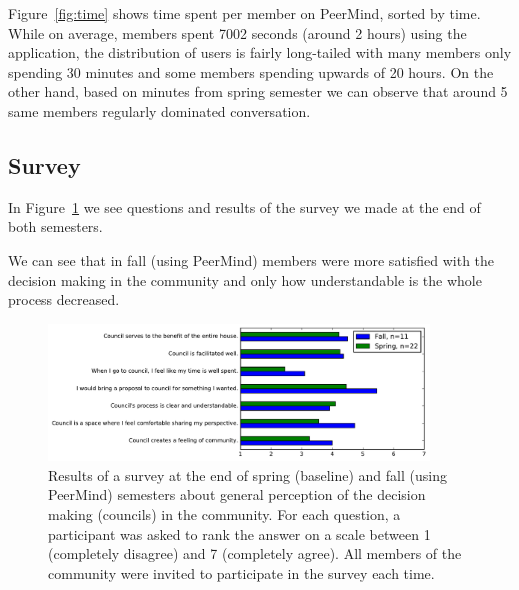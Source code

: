 \documentclass[format=acmsmall, review=true, screen=true, anonymous=true]{acmart}
\begin{document}
Figure~\ref{fig:time} shows time spent per member on PeerMind, sorted by time. While on average, members
spent 7002 seconds (around 2 hours) using the application, the distribution of users is fairly
long-tailed with many members only spending 30 minutes and some members spending upwards of 20 hours.
On the other hand, based on minutes from spring semester we can observe that around 5 same members
regularly dominated conversation.


\subsection{Survey}

In Figure~\ref{fig:survey-comparison} we see questions and results of the survey we made at the end of both semesters.

We can see that in fall (using PeerMind) members were more satisfied with the decision making in the community and only how understandable
is the whole process decreased.

\begin{figure}[ht]
\centering
\includegraphics[width=0.9\textwidth]{figures/survey-comparison.pdf}
\caption{Results of a survey at the end of spring (baseline) and fall (using PeerMind) semesters about general perception of the decision making (councils) in the community.
For each question, a participant was asked to rank the answer on a scale between 1 (completely disagree) and 7 (completely agree). All members
of the community were invited to participate in the survey each time.}
\label{fig:survey-comparison}
\end{figure}


\end{document}
